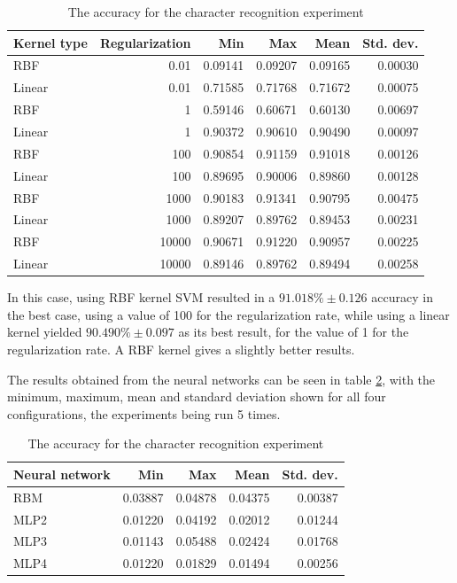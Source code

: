 \begin{table}[h]
\caption{The accuracy for the character recognition experiment}
\label{table:recog_values}
\begin{tabular}{lrrrrr}
\toprule
Kernel type & Regularization & Min     & Max     & Mean    & Std. dev. \\ 
\midrule
RBF & 0.01 & 0.09141 & 0.09207 & 0.09165 & 0.00030 \\ 
Linear & 0.01 & 0.71585 & 0.71768 & 0.71672 & 0.00075 \\ 
RBF & 1 & 0.59146 & 0.60671 & 0.60130 & 0.00697 \\ 
Linear & 1 & 0.90372 & 0.90610 & 0.90490 & 0.00097 \\ 
RBF & 100 & 0.90854 & 0.91159 & 0.91018 & 0.00126 \\ 
Linear & 100 & 0.89695 & 0.90006 & 0.89860 & 0.00128 \\ 
RBF & 1000 & 0.90183 & 0.91341 & 0.90795 & 0.00475 \\ 
Linear & 1000 & 0.89207 & 0.89762 & 0.89453 & 0.00231 \\ 
RBF & 10000 & 0.90671 & 0.91220 & 0.90957 & 0.00225 \\ 
Linear & 10000 & 0.89146 & 0.89762 & 0.89494 & 0.00258 \\ 
\bottomrule
\end{tabular}
\end{table}

In this case, using RBF kernel SVM resulted in a $ 91.018\% \pm 0.126 $ accuracy in the best case, using a value of 100 for the regularization rate, while using a linear kernel yielded $ 90.490\% \pm 0.097 $ as its best result, for the value of 1 for the regularization rate. A RBF kernel gives a slightly better results.

The results obtained from the neural networks can be seen in table \ref{table:nn_table}, with the minimum, maximum, mean and standard deviation shown for all four configurations, the experiments being run 5 times. 

\begin{table}[h]
\caption{The accuracy for the character recognition experiment}
\label{table:nn_table}
\begin{tabular}{lrrrr}
\toprule
Neural network & Min     & Max     & Mean    & Std. dev. \\ 
\midrule
RBM & 0.03887 & 0.04878 & 0.04375 & 0.00387 \\
MLP2 & 0.01220 & 0.04192 & 0.02012 & 0.01244 \\
MLP3 & 0.01143 & 0.05488 & 0.02424 & 0.01768 \\
MLP4 & 0.01220 & 0.01829 & 0.01494 & 0.00256 \\ 
\bottomrule
\end{tabular}
\end{table}

